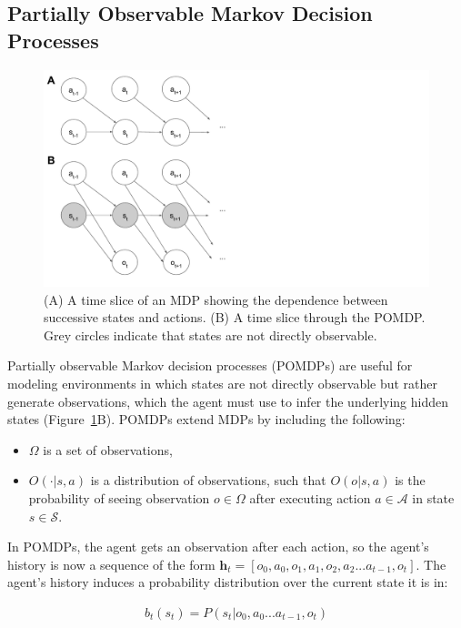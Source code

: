 \documentclass[11pt]{article}
\begin{document}
\subsection{Partially Observable Markov Decision Processes}

\begin{figure}
\centering
\includegraphics[scale=0.7,  trim = 0 10 400 10]{figures/pomdp.pdf}
\caption{(A) A time slice of an MDP showing the dependence between successive states and actions. (B) A time slice through the POMDP. Grey circles indicate that states are not directly observable.}
\label{fig:pomdp}
\end{figure}

Partially observable Markov decision processes (POMDPs) are useful for modeling environments in which states are not directly observable but rather generate observations, which the agent must use to infer the underlying hidden states (Figure~\ref{fig:pomdp}B). POMDPs extend MDPs by including the following:

\begin{itemize}
\item $\Omega$ is a set of observations,
\item $O(\cdot|s,a)$ is a distribution of observations, such that $O(o|s,a)$ is the probability of seeing observation $o \in \Omega$ after executing action $a \in \mathcal{A}$ in state $s \in \mathcal{S}$.
\end{itemize}

In POMDPs, the agent gets an observation after each action, so the agent's history is now a sequence of the form $\mathbf{h}_t = [o_0, a_0, o_1, a_1, o_2, a_2 ... a_{t-1}, o_t]$. The agent's history induces a probability distribution over the current state it is in:

\begin{align*}
b_t(s_t) = P(s_t | o_0, a_0 ... a_{t-1}, o_t)
\end{align*}
\end{document}
